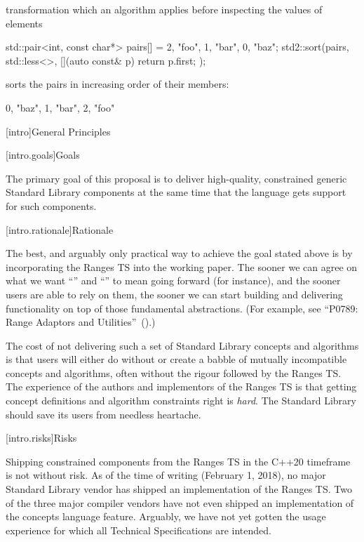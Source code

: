 %
 transformation which an algorithm applies
before inspecting the values of elements

\enterexample
\begin{codeblock}
std::pair<int, const char*> pairs[] = {{2, "foo"}, {1, "bar"}, {0, "baz"}};
std2::sort(pairs, std::less<>{}, [](auto const& p) { return p.first; });
\end{codeblock}
sorts the pairs in increasing order of their  members:
\begin{codeblock}
{{0, "baz"}, {1, "bar"}, {2, "foo"}}
\end{codeblock}
\exitexample

[intro]{General Principles}

[intro.goals]{Goals}

\pnum
The primary goal of this proposal is to deliver high-quality, constrained generic
Standard Library components at the same time that the language gets support for
such components. 

[intro.rationale]{Rationale}

\pnum
The best, and arguably only practical way to achieve the goal stated above is by
incorporating the Ranges TS into the working paper. The sooner we can agree on
what we want ``'' and ``'' to mean going forward
(for instance), and the sooner users are able to rely on them, the sooner we can
start building and delivering functionality on top of those fundamental
abstractions. (For example, see ``P0789: Range Adaptors and
Utilities''~(\cite{P0789}).)

\pnum
The cost of not delivering such a set of Standard Library concepts
and algorithms is that users will either do without or create a babble of mutually
incompatible concepts and algorithms, often without the rigour followed by the
Ranges TS. The experience of the authors and implementors of the Ranges TS is that
getting concept definitions and algorithm constraints right is \textit{hard}. The
Standard Library should save its users from needless heartache.

[intro.risks]{Risks}

\pnum
Shipping constrained components from the Ranges TS in the C++20 timeframe is not
without risk. As of the time of writing (February 1, 2018), no major Standard
Library vendor has shipped an implementation of the Ranges TS. Two of the three
major compiler vendors have not even shipped an implementation of the concepts
language feature. Arguably, we have not yet gotten the usage experience for which
all Technical Specifications are intended.

